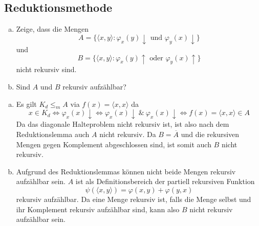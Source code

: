 \documentclass[german,headsepline]{scrartcl}
\theoremstyle{definition}
\begin{document}
	\subsection{Reduktionsmethode}
	\begin{question}[subtitle={Nachklausur 2012}]
		\begin{enumerate}[(a)]
			\item Zeige, dass die Mengen
			\[A=\{\langle x,y\rangle\colon\varphi_x(y)\downarrow\text{ und }\varphi_y(x)\downarrow\}\]
			und
			\[B=\{\langle x,y\rangle\colon\varphi_x(y)\uparrow\text{ oder }\varphi_y(x)\uparrow\}\]
			nicht rekursiv sind.
			\item Sind $A$ und $B$ rekursiv aufzählbar?
		\end{enumerate}
	\end{question}
	\begin{solution}
		\begin{enumerate}[(a)]
			\item Es gilt $K_d\leq_m A$ via $f(x)=\langle x,x\rangle$ da
			\[x\in K_d\Leftrightarrow\varphi_x(x)\downarrow\Leftrightarrow
			\varphi_x(x)\downarrow~\&~\varphi_x(x)\downarrow\Leftrightarrow
			f(x)=\langle x,x\rangle\in A\]
			Da das diagonale Halteproblem nicht rekursiv ist,
			ist also nach dem Reduktionslemma auch $A$ nicht rekursiv.
			Da $B=\overline{A}$ und die rekursiven Mengen gegen Komplement abgeschlossen sind,
			ist somit auch $B$ nicht rekursiv.
			\item Aufgrund des Reduktionslemmas können nicht beide Mengen rekursiv aufzählbar sein.
			$A$ ist als Definitionsbereich der partiell rekursiven Funktion
			\[\psi(\langle x,y\rangle)=\varphi(x,y)+\varphi(y,x)\]
			rekursiv aufzählbar.
			Da eine Menge rekursiv ist, falls die Menge selbst und ihr Komplement rekursiv aufzählbar sind,
			kann also $B$ nicht rekursiv aufzählbar sein.
		\end{enumerate}
	\end{solution}
	
\end{document}
